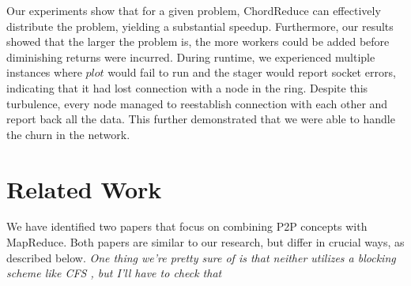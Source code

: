 \documentclass[10pt, conference, compsocconf]{IEEEtran}
\begin{document}
Our experiments show that for a given problem, ChordReduce can effectively distribute the problem, yielding a substantial speedup.  Furthermore, our results showed that the larger the problem is, the more workers could be added before diminishing returns were incurred.  During runtime, we experienced multiple instances where $plot$ would fail to run and the stager would report socket errors, indicating that it had lost connection with a node in the ring.  Despite this turbulence, every node managed to reestablish connection with each other and report back all the data.  This further demonstrated that we were able to handle the churn in the network.



\section{Related Work}

We have identified two papers that focus on combining P2P concepts with MapReduce.  Both papers are similar to our research, but differ in crucial ways, as described below.
\textit{One thing we're pretty sure of is that neither utilizes a blocking scheme like CFS \cite{CFS}, but I'll have to check that}




\end{document}
